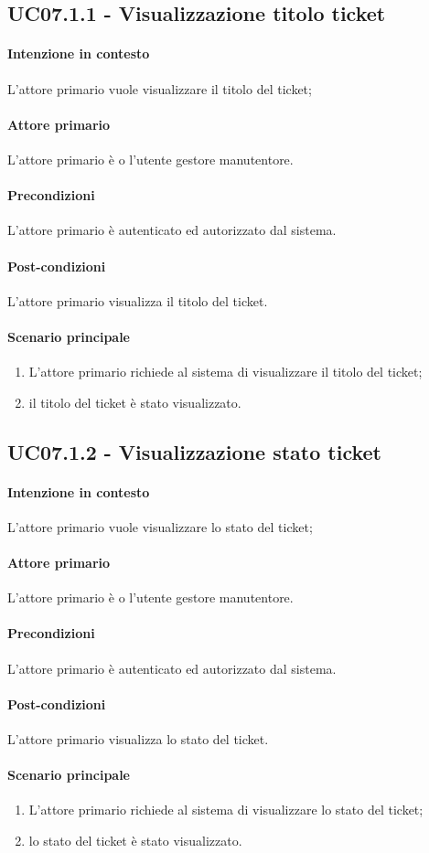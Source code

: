 \subsection{UC07.1.1 - Visualizzazione titolo ticket}\label{uc:07.1.1}

\paragraph{Intenzione in contesto} L'attore primario vuole visualizzare il titolo del ticket;
\paragraph{Attore primario} L'attore primario è o l'utente gestore manutentore.
\paragraph{Precondizioni}  L'attore primario è autenticato ed autorizzato dal sistema.
\paragraph{Post-condizioni} L'attore primario visualizza il titolo del ticket.
\paragraph{Scenario principale}
\begin{enumerate}
    \item L'attore primario richiede al sistema di visualizzare il titolo del ticket;
    \item il titolo del ticket è stato visualizzato.
\end{enumerate}

\subsection{UC07.1.2 - Visualizzazione stato ticket}\label{uc:07.1.2}

\paragraph{Intenzione in contesto} L'attore primario vuole visualizzare lo stato del ticket;
\paragraph{Attore primario} L'attore primario è o l'utente gestore manutentore.
\paragraph{Precondizioni}  L'attore primario è autenticato ed autorizzato dal sistema.
\paragraph{Post-condizioni} L'attore primario visualizza lo stato del ticket.
\paragraph{Scenario principale}
\begin{enumerate}
    \item L'attore primario richiede al sistema di visualizzare lo stato del ticket;
    \item lo stato del ticket è stato visualizzato.
\end{enumerate}